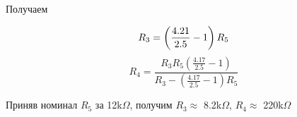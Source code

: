 Получаем  
\begin{figure}[!h]
    \begin{equation*}
        R_3 = \left(\frac{4.21}{2.5} - 1 \right) R_5 \\
    \end{equation*}
    \begin{equation*}
        R_4 = \frac{R_3 R_5  \left(\frac{4.17}{2.5} - 1\right)}{R_3 - \left(\frac{4.17}{2.5} - 1\right) R_5}
    \end{equation*}
    
\end{figure} 

Приняв номинал $R_5$ за 12k$\Omega$, получим $R_3 \approx$ 8.2k$\Omega$, $R_4 \approx$ 220k$\Omega$

\newpage